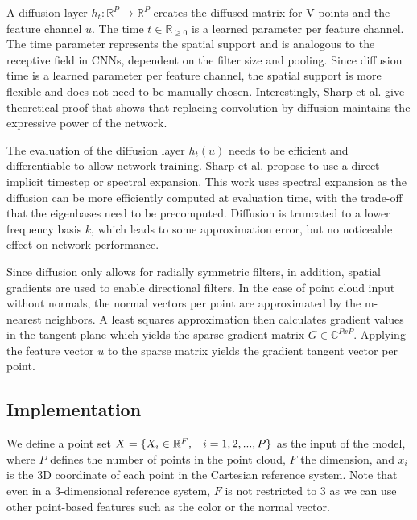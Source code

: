 \documentclass[class=article, crop=false]{standalone}
\begin{document}
A diffusion layer $h_t : \mathbb{R}^P \to \mathbb{R}^P$ creates the diffused matrix for V points and the feature channel $u$. The time $t \in \mathbb{R}_{\geq 0}$ is a learned parameter per feature channel. The time parameter represents the spatial support and is analogous to the receptive field in CNNs, dependent on the filter size and pooling. Since diffusion time is a learned parameter per feature channel, the spatial support is more flexible and does not need to be manually chosen. Interestingly, Sharp et al. give theoretical proof that shows that replacing convolution by diffusion maintains the expressive power of the network.

The evaluation of the diffusion layer $h_t(u)$ needs to be efficient and differentiable to allow network training. Sharp et al. propose to use a direct implicit timestep or spectral expansion. This work uses spectral expansion as the diffusion can be more efficiently computed at evaluation time, with the trade-off that the eigenbases need to be precomputed. Diffusion is truncated to a lower frequency basis $k$, which leads to some approximation error, but no noticeable effect on network performance.

Since diffusion only allows for radially symmetric filters, in addition, spatial gradients are used to enable directional filters. In the case of point cloud input without normals, the normal vectors per point are approximated by the m-nearest neighbors. A least squares approximation then calculates gradient values in the tangent plane which yields the sparse gradient matrix $G \in \mathbb{C}^{PxP}$. Applying the feature vector $u$ to the sparse matrix yields the gradient tangent vector per point.




\subsection{Implementation}
We define a point set \begin{math}X=\{X_i \in \mathbb{R}^F,\hspace{0.3cm}i = 1,2,...,P\}\end{math} as the input of the model, where $P$ defines the number of points in the point cloud, $F$ the dimension, and $x_i$ is the 3D coordinate of each point in the Cartesian reference system. Note that even in a 3-dimensional reference system, $F$ is not restricted to 3 as we can use other point-based features such as the color or the normal vector.
\end{document}
